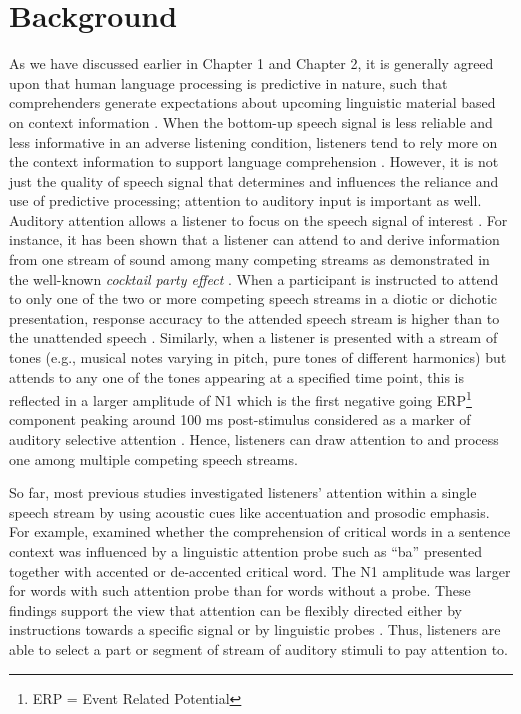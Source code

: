 \documentclass[a4paper, nobind]{templates/ociamthesis}
\begin{document}
\hypertarget{background-1}{%
\section{Background}\label{background-1}}

As we have discussed earlier in Chapter 1 and Chapter 2, it is generally agreed upon that human language processing is predictive in nature, such that comprehenders generate expectations about upcoming linguistic material based on context information \autocites[for reviews, see][]{Staub2015,Kuperberg2016,Pickering2018,Nieuwland2019}.
When the bottom-up speech signal is less reliable and less informative in an adverse listening condition, listeners tend to rely more on the context information to support language comprehension \autocite{Sheldon2008b,Obleser2010,Amichetti2018}.
However, it is not just the quality of speech signal that determines and influences the reliance and use of predictive processing;
attention to auditory input is important as well.
Auditory attention allows a listener to focus on the speech signal of interest \autocites[for reviews, see][]{Fritz2007}[cf.][]{Lange2013}.
For instance, it has been shown that a listener can attend to and derive information from one stream of sound among many competing streams as demonstrated in the well-known \emph{cocktail party effect} \autocite{Cherry1953,Hafter2007}.
When a participant is instructed to attend to only one of the two or more competing speech streams in a diotic or dichotic presentation, response accuracy to the attended speech stream is higher than to the unattended speech \autocite[e.g.,][]{Toth2020}.
Similarly, when a listener is presented with a stream of tones (e.g., musical notes varying in pitch, pure tones of different harmonics) but attends to any one of the tones appearing at a specified time point, this is reflected in a larger amplitude of N1 \autocites[e.g.,][]{Lange2010}[see also,][]{Sanders2008}
which is the first negative going ERP\footnote{ERP = Event Related Potential} component peaking around 100 ms post-stimulus considered as a marker of auditory selective attention \autocite{Naatanen1987,Thorton2007}.
Hence, listeners can draw attention to and process one among multiple competing speech streams.

So far, most previous studies investigated listeners' attention within a single speech stream by using acoustic cues like accentuation and prosodic emphasis.
For example, \textcite{Li2014} examined whether the comprehension of critical words in a sentence context was influenced by a linguistic attention probe such as ``ba'' presented together with accented or de-accented critical word.
The N1 amplitude was larger for words with such attention probe than for words without a probe.
These findings support the view that attention can be flexibly directed either by instructions towards a specific signal or by linguistic probes \autocites{Li2017}[see also,][]{Brunelliere2019}.
Thus, listeners are able to select a part or segment of stream of auditory stimuli to pay attention to.
\end{document}
